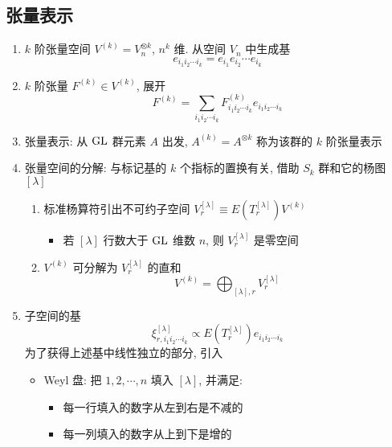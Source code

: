\documentclass[12pt,a4paper]{article}%
\numberwithin{equation}{section}%
\begin{document}
\subsection{张量表示} %
\label{sub:tensor_repr}
\begin{enumerate}
	\item $k$ 阶张量空间 $V^{(k)} = V_n^{\otimes k}$, $n^k$ 维. 从空间 $V_n$ 中生成基
	\begin{equation}
		e_{i_1i_2\cdots i_k} = e_{i_1}e_{i_2}\cdots e_{i_k}
	\end{equation}
	\item $k$ 阶张量 $F^{(k)} \in V^{(k)}$, 展开
	\begin{equation}
		F^{(k)} = \sum_{i_1i_2\cdots i_k} F^{(k)}_{i_1i_2\cdots i_k} e_{i_1i_2\cdots i_k}
	\end{equation}
	\item 张量表示: 从 $\mathrm{GL}$ 群元素 $A$ 出发, $A^{(k)} = A^{\otimes k}$ 称为该群的 $k$ 阶张量表示
	\item 张量空间的分解: 与标记基的 $k$ 个指标的置换有关, 借助 $S_k$ 群和它的杨图 $[\lambda]$
	\begin{enumerate}
		\item 标准杨算符引出不可约子空间 $V_r^{[\lambda]}\equiv E(T_r^{[\lambda]}) V^{(k)}$
		\begin{itemize}
			\item 若 $[\lambda]$ 行数大于 $\mathrm{GL}$ 维数 $n$, 则 $V_r^{[\lambda]} $ 是零空间
		\end{itemize}
		\item $V^{(k)}$ 可分解为 $V_r^{[\lambda]}$ 的直和
		\begin{equation}
			V^{(k)} = \bigoplus_{[\lambda],r} V_r^{[\lambda]}
		\end{equation}
	\end{enumerate}
	\item 子空间的基
	\begin{equation}
		\xi^{[\lambda]}_{r,i_1i_2\cdots i_k}\propto E(T_r^{[\lambda]}) e_{i_1i_2\cdots i_k}
	\end{equation}
	为了获得上述基中线性独立的部分, 引入
	\begin{itemize}
		\item Weyl 盘: 把 $1,2,\cdots, n$ 填入 $[\lambda]$, 并满足: 
		\begin{itemize}
			\item 每一行填入的数字从左到右是不减的
			\item 每一列填入的数字从上到下是增的
		\end{itemize}
	\end{itemize}

\end{enumerate}
\end{document}

